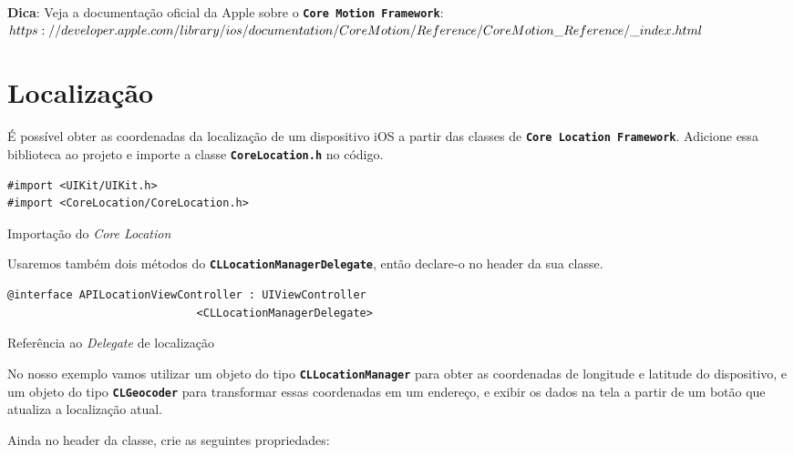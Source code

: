 \documentclass[a4paper,12pt,brazil,oneside]{book}
\begin{document}
\begin{framed}

\textbf{Dica}: Veja a documentação oficial da Apple sobre o \texttt{\textbf{Core Motion Framework}}:\\
\(https://developer.apple.com/library/ios/documentation/CoreMotion/Reference/\\CoreMotion\_Reference/\_index.html\)

\end{framed}

\section{Localização}


É possível obter as coordenadas da localização de um dispositivo iOS a partir das classes de \texttt{\textbf{Core Location Framework}}. Adicione essa biblioteca ao projeto e importe a classe \texttt{\textbf{CoreLocation.h}} no código.

\begin{listing}[H]
\begin{verbatim}
#import <UIKit/UIKit.h>
#import <CoreLocation/CoreLocation.h>
\end{verbatim}
\caption{Importação do \emph{Core Location}}
\end{listing}


Usaremos também dois métodos do \texttt{\textbf{CLLocationManagerDelegate}}, então declare-o no header da sua classe.

\begin{listing}[H]
\begin{verbatim}
@interface APILocationViewController : UIViewController
                             <CLLocationManagerDelegate>
\end{verbatim}
\caption{Referência ao \emph{Delegate} de localização}
\end{listing}


No nosso exemplo vamos utilizar um objeto do tipo \texttt{\textbf{CLLocationManager}} para obter as coordenadas de longitude e latitude do dispositivo, e um objeto do tipo \texttt{\textbf{CLGeocoder}} para transformar essas coordenadas em um endereço, e exibir os dados na tela a partir de um botão que atualiza a localização atual.

Ainda no header da classe, crie as seguintes propriedades:
\end{document}
